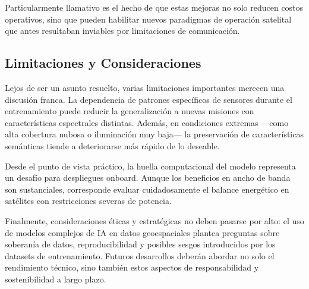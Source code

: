 Particularmente llamativo es el hecho de que estas mejoras no solo reducen costos operativos, sino que pueden habilitar nuevos paradigmas de operación satelital que antes resultaban inviables por limitaciones de comunicación.

\subsection{Limitaciones y Consideraciones}

Lejos de ser un asunto resuelto, varias limitaciones importantes merecen una discusión franca. La dependencia de patrones específicos de sensores durante el entrenamiento puede reducir la generalización a nuevas misiones con características espectrales distintas. Además, en condiciones extremas —como alta cobertura nubosa o iluminación muy baja— la preservación de características semánticas tiende a deteriorarse más rápido de lo deseable.

Desde el punto de vista práctico, la huella computacional del modelo representa un desafío para despliegues onboard. Aunque los beneficios en ancho de banda son sustanciales, corresponde evaluar cuidadosamente el balance energético en satélites con restricciones severas de potencia.

Finalmente, consideraciones éticas y estratégicas no deben pasarse por alto: el uso de modelos complejos de IA en datos geoespaciales plantea preguntas sobre soberanía de datos, reproducibilidad y posibles sesgos introducidos por los datasets de entrenamiento. Futuros desarrollos deberán abordar no solo el rendimiento técnico, sino también estos aspectos de responsabilidad y sostenibilidad a largo plazo.